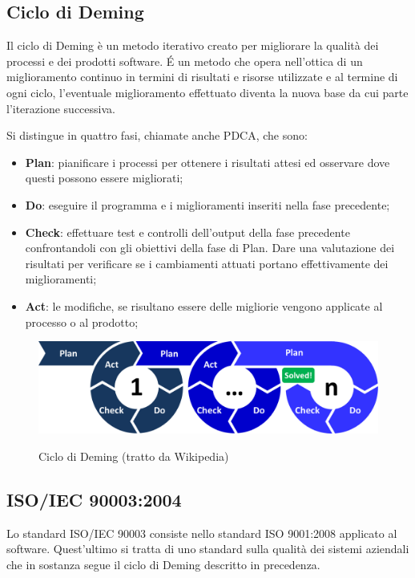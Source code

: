 	\subsection{Ciclo di Deming}
	Il ciclo di Deming è un metodo iterativo creato per migliorare la qualità dei processi e dei prodotti software. \'E un metodo che opera nell'ottica di un miglioramento continuo in termini di risultati e risorse utilizzate e al termine di ogni ciclo, l'eventuale miglioramento effettuato diventa la nuova base da cui parte l'iterazione successiva.
	
	Si distingue in quattro fasi, chiamate anche PDCA, che sono:
	
	\begin{itemize}
		\item \textbf{Plan}: pianificare i processi per ottenere i risultati attesi ed osservare dove questi possono essere migliorati;
		\item \textbf{Do}: eseguire il programma e i miglioramenti inseriti nella fase precedente;
		\item \textbf{Check}: effettuare test e controlli dell'output della fase precedente confrontandoli con gli obiettivi della fase di Plan. Dare una valutazione dei risultati per verificare se i cambiamenti attuati portano effettivamente dei miglioramenti;
		\item \textbf{Act}: le modifiche, se risultano essere delle migliorie vengono applicate al processo o al prodotto;
	\end{itemize}

	\begin{figure}[H]
		\includegraphics[width=\textwidth]{img/PDCA}
		\label{fig:PDCA}
		\caption[Ciclo di Deming]{Ciclo di Deming (tratto da Wikipedia)}
	\end{figure}

	\subsection{ISO/IEC 90003:2004}
	Lo standard ISO/IEC 90003 consiste nello standard ISO 9001:2008 applicato al software. Quest'ultimo si tratta di uno standard sulla qualità dei sistemi aziendali che in sostanza segue il ciclo di Deming descritto in precedenza.
	

